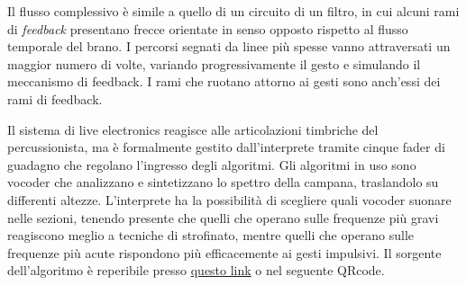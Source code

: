 \documentclass{book}
\begin{document}
\begin{minipage}{0.2\textwidth}
\end{minipage}%
\begin{minipage}{0.6\textwidth}
\justify Il flusso complessivo è simile a quello di un circuito di un filtro, in cui alcuni rami di \textit{feedback} presentano frecce orientate in senso opposto rispetto al flusso temporale del brano.
I percorsi segnati da linee più spesse vanno attraversati un maggior numero di volte, variando progressivamente il gesto e simulando il meccanismo di feedback.
I rami che ruotano attorno ai gesti sono anch'essi dei rami di feedback.\end{minipage}

\null
\quad  %

Il sistema di live electronics reagisce alle articolazioni timbriche del percussionista, ma è formalmente gestito dall’interprete tramite cinque fader di guadagno che regolano l’ingresso degli algoritmi. Gli algoritmi in uso sono vocoder che analizzano e sintetizzano lo spettro della campana, traslandolo su differenti altezze. L’interprete ha la possibilità di scegliere quali vocoder suonare nelle sezioni, tenendo presente che quelli che operano sulle frequenze più gravi reagiscono meglio a tecniche di strofinato, mentre quelli che operano sulle frequenze più acute rispondono più efficacemente ai gesti impulsivi.
Il sorgente dell'algoritmo è reperibile presso \href{https://github.com/DMGiulioRomano/strappi}{questo link} o nel seguente QRcode.

\null
\quad  %

\null
\quad  %

\begin{center}
\end{center}
\end{document}
